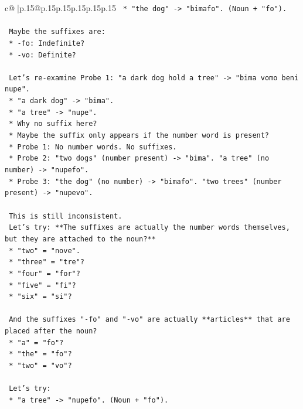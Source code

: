 \documentclass{article}
\begin{document}
{\begin{supertabular}{c@{$\;$}|p{.15\linewidth}@{}p{.15\linewidth}p{.15\linewidth}p{.15\linewidth}p{.15\linewidth}p{.15\linewidth}}
{{{\texttt{    *   "the dog" {-}> "bimafo". (Noun + "fo").} \\
\\ 
\texttt{    Maybe the suffixes are:} \\
\texttt{    *   {-}fo: Indefinite?} \\
\texttt{    *   {-}vo: Definite?} \\
\\ 
\texttt{    Let's re{-}examine Probe 1: "a dark dog hold a tree" {-}> "bima vomo beni nupe".} \\
\texttt{    *   "a dark dog" {-}> "bima".} \\
\texttt{    *   "a tree" {-}> "nupe".} \\
\texttt{    *   Why no suffix here?} \\
\texttt{    *   Maybe the suffix only appears if the number word is present?} \\
\texttt{    *   Probe 1: No number words. No suffixes.} \\
\texttt{    *   Probe 2: "two dogs" (number present) {-}> "bima". "a tree" (no number) {-}> "nupefo".} \\
\texttt{    *   Probe 3: "the dog" (no number) {-}> "bimafo". "two trees" (number present) {-}> "nupevo".} \\
\\ 
\texttt{    This is still inconsistent.} \\
\texttt{    Let's try: **The suffixes are actually the number words themselves, but they are attached to the noun?**} \\
\texttt{    *   "two" = "nove".} \\
\texttt{    *   "three" = "tre"?} \\
\texttt{    *   "four" = "for"?} \\
\texttt{    *   "five" = "fi"?} \\
\texttt{    *   "six" = "si"?} \\
\\ 
\texttt{    And the suffixes "{-}fo" and "{-}vo" are actually **articles** that are placed after the noun?} \\
\texttt{    *   "a" = "fo"?} \\
\texttt{    *   "the" = "fo"?} \\
\texttt{    *   "two" = "vo"?} \\
\\ 
\texttt{    Let's try:} \\
\texttt{    *   "a tree" {-}> "nupefo". (Noun + "fo").} \\
}}}
\end{supertabular}}
\end{document}

